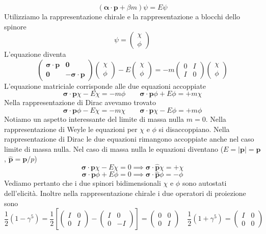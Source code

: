 $$
(\boldsymbol{\alpha} \cdot \mathbf{p} + \beta m)\psi = E\psi
$$
Utilizziamo la rappresentazione chirale e la rappresentazione a blocchi dello spinore
$$
\psi = \begin{pmatrix} \chi \\ \phi \end{pmatrix}
$$
L'equazione diventa
$$
\begin{pmatrix} \boldsymbol{\sigma} \cdot \mathbf{p} & \mathbf{0} \\ \mathbf{0} & -\boldsymbol{\sigma} \cdot \mathbf{p} \end{pmatrix} \begin{pmatrix} \chi \\ \phi \end{pmatrix} - E \begin{pmatrix} \chi \\ \phi \end{pmatrix} = -m \begin{pmatrix} 0 & I \\ I & 0 \end{pmatrix} \begin{pmatrix} \chi \\ \phi \end{pmatrix}
$$
L'equazione matriciale corrisponde alle due equazioni accoppiate
$$
\boldsymbol{\sigma} \cdot \mathbf{p}\chi - E\chi = -m\phi \qquad \boldsymbol{\sigma} \cdot \mathbf{p}\phi + E\phi = +m\chi
$$
Nella rappresentazione di Dirac avevamo trovato
$$
\boldsymbol{\sigma} \cdot \mathbf{p}\phi - E\chi = -m\chi \qquad \boldsymbol{\sigma} \cdot \mathbf{p}\chi - E\phi = +m\phi
$$
Notiamo un aspetto interessante del limite di massa nulla $m=0$. Nella rappresentazione di Weyle le equazioni per $\chi$ e $\phi$ si disaccoppiano. Nella rappresentazione di Dirac le due equazioni rimangono accoppiate anche nel caso limite di massa nulla. Nel caso di massa nulla le equazioni diventano ($E=|\mathbf{p}|=\mathbf{p}$, $\hat{\mathbf{p}}=\mathbf{p}/p$)
$$
\boldsymbol{\sigma} \cdot \mathbf{p}\chi - E\chi = 0 \implies \boldsymbol{\sigma} \cdot \hat{\mathbf{p}}\chi = +\chi
$$
$$
\boldsymbol{\sigma} \cdot \mathbf{p}\phi + E\phi = 0 \implies \boldsymbol{\sigma} \cdot \hat{\mathbf{p}}\phi = -\phi
$$
Vediamo pertanto che i due spinori bidimensionali $\chi$ e $\phi$ sono autostati dell'elicità. Inoltre nella rappresentazione chirale i due operatori di proiezione sono
$$
\frac{1}{2}(1 - \gamma^5) = \frac{1}{2} \left[ \begin{pmatrix} I & 0 \\ 0 & I \end{pmatrix} - \begin{pmatrix} I & 0 \\ 0 & -I \end{pmatrix} \right] = \begin{pmatrix} 0 & 0 \\ 0 & I \end{pmatrix} \quad \frac{1}{2}(1 + \gamma^5) = \begin{pmatrix} I & 0 \\ 0 & 0 \end{pmatrix}
$$
